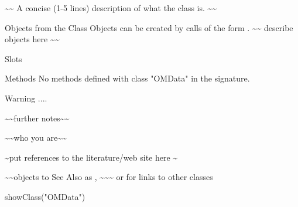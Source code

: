 \begin{Description}\relax
\textasciitilde{}\textasciitilde{} A concise (1-5 lines) description of what the class is.  \textasciitilde{}\textasciitilde{}
\end{Description}
\begin{Section}{Objects from the Class}
Objects can be created by calls of the form .
\textasciitilde{}\textasciitilde{} describe objects here \textasciitilde{}\textasciitilde{}
\end{Section}
\begin{Section}{Slots}
\end{Section}
\begin{Section}{Methods}
No methods defined with class "OMData" in the signature.
\end{Section}
\begin{Section}{Warning}
....
\end{Section}
\begin{Note}\relax
\textasciitilde{}\textasciitilde{}further notes\textasciitilde{}\textasciitilde{}
\end{Note}
\begin{Author}\relax
\textasciitilde{}\textasciitilde{}who you are\textasciitilde{}\textasciitilde{}
\end{Author}
\begin{References}\relax
\textasciitilde{}put references to the literature/web site here \textasciitilde{}
\end{References}
\begin{SeeAlso}\relax
\textasciitilde{}\textasciitilde{}objects to See Also as , \textasciitilde{}\textasciitilde{}\textasciitilde{}
or  for links to other classes
\end{SeeAlso}
\begin{Examples}
\begin{ExampleCode}
showClass("OMData")
\end{ExampleCode}
\end{Examples}

